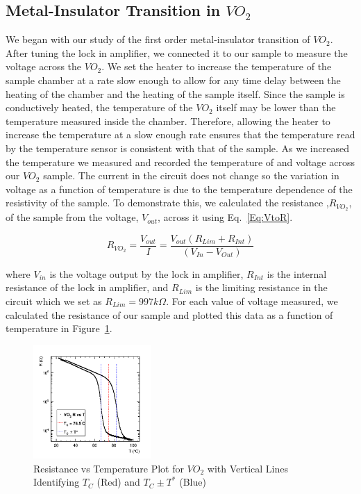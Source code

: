 \documentclass[%
 reprint,
 amsmath,amssymb,
 aps,
 pra,
]{revtex4-1}
\begin{document}
\subsection{Metal-Insulator Transition in $VO_{2}$}
We began with our study of the first order metal-insulator transition of $VO_{2}$. After tuning the lock in amplifier, we connected it to our sample to measure the voltage across the $VO_{2}$. We set the heater to increase the temperature of the sample chamber at a rate slow enough to allow for any time delay between the heating of the chamber and the heating of the sample itself. Since the sample is conductively heated, the temperature of the $VO_{2}$ itself may be lower than the temperature measured inside the chamber. Therefore, allowing the heater to increase the temperature at a slow enough rate ensures that the temperature read by the temperature sensor is consistent with that of the sample. As we increased the temperature we measured and recorded the temperature of and voltage across our $VO_{2}$ sample. The current in the circuit does not change so the variation in voltage as a function of temperature is due to the temperature dependence of the resistivity of the sample. To demonstrate this, we calculated the resistance ,$R_{VO_{2}}$, of the sample from the voltage, $V_{out}$, across it using Eq.~\ref{Eq:VtoR}.

\begin{equation}\label{Eq:VtoR}
R_{VO_{2}} = \frac{V_{out}}{I} = \frac{V_{out} (R_{Lim} + R_{Int})}{(V_{In} - V_{Out})} 
\end{equation}

where $V_{in}$ is the voltage output by the lock in amplifier, $R_{Int}$ is the internal resistance of the lock in amplifier, and $R_{Lim}$ is the limiting resistance in the circuit which we set as $R_{Lim} = 997 k\Omega$. For each value of voltage measured, we calculated the resistance of our sample and plotted this data as a function of temperature in Figure~\ref{Fig:RvT1}.

\begin{figure}[H]
	\centering
	\includegraphics[width=0.4\textwidth]{VO2_RvT_withTC.png}
	\caption{Resistance vs Temperature Plot for $VO_{2}$ with Vertical Lines Identifying $T_{C}$ (Red) and $T_{C} \pm T^{*}$ (Blue)}
	\label{Fig:RvT1}
\end{figure}
\end{document}
